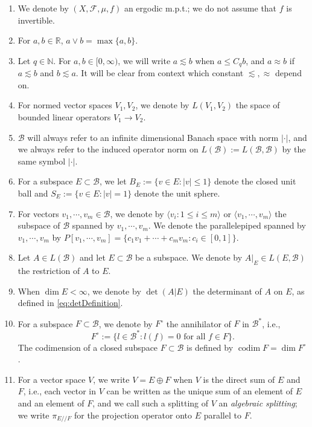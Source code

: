 \documentclass[11pt]{amsart}
\theoremstyle{theorem}
\theoremstyle{definition}
\numberwithin{equation}{section}
\newcommand{\N}{\mathbb{N}}
\newcommand{\R}{\mathbb{R}}
\newcommand{\Fc}{\mathcal{F}}
\newcommand{\Bc}{\mathcal{B}}
\newcommand{\ds}{/ \! /}
\newcommand{\codim}{\operatorname{codim}}
\begin{document}
\begin{enumerate}

\item We denote by $(X, \Fc, \mu, f)$ an ergodic m.p.t.; we do not assume that $f$ is invertible.

\item For $a,b \in \R$, $a \vee b = \max\{a, b\}$.

\item Let $q \in \N$. For $a,b \in [0,\infty)$, we will write $a \lesssim b$ when $a \leq C_q b$, and $a \approx b$ if $a \lesssim b$ and $b \lesssim a$. It will be clear from context which constant $\lesssim, \approx$ depend on.

\item For normed vector spaces $V_1, V_2$, we denote by $L(V_1, V_2)$ the space of bounded linear operators $V_1 \to V_2$. 

\item $\Bc$ will always refer to an infinite dimensional Banach space with norm $|\cdot|$, and we always refer to the induced operator norm on $L(\Bc) := L(\Bc, \Bc)$ by the same symbol $|\cdot|$.

\item For a subspace $E \subset \Bc$, we let $B_E := \{v \in E : |v| \leq 1\}$ denote the closed unit ball and $S_E := \{v \in E : |v| = 1\}$ denote the unit sphere. 
\item For vectors $v_1, \cdots, v_m \in \Bc$, we denote by $\langle v_i : 1 \leq i \leq m \rangle$ or $\langle v_1, \cdots, v_m \rangle $ the subspace of $\Bc$ spanned by $v_1, \cdots, v_m$.  We denote the parallelepiped spanned by $v_1, \cdots, v_m$ by $P[v_1, \cdots, v_m] = \{c_1 v_1 + \cdots + c_m v_m : c_i \in [0,1]\}$.

\item Let $A \in L(\Bc)$ and let $E \subset \Bc$ be a subspace. We denote by $A|_E \in L(E, \Bc)$ the restriction of $A$ to $E$. 
\item When $\dim E < \infty$, we denote by $\det(A | E)$ the determinant of $A$ on $E$, as defined in \eqref{eq:detDefinition}.

\item For a subspace $F \subset \Bc$, we denote by $F^{\circ}$ the annihilator of $F$ in $\Bc^*$, i.e., 
\[F^{\circ} := \{l \in \Bc^* : l(f) = 0 \text{ for all } f \in F\}.\]
The codimension of a closed subspace $F \subset \Bc$ is defined by $\codim F = \dim F^{\circ}$.

\item For a vector space $V$, we write $V = E \oplus F$ when $V$ is the direct sum of $E$ and $F$, i.e., each vector in $V$ can be written as the unique sum of an element of $E$ and an element of $F$, and we call such a splitting of $V$ an \emph{algebraic splitting}; we write $\pi_{E \ds F}$ for the projection operator onto $E$ parallel to $F$. 


\end{enumerate}
\end{document}
